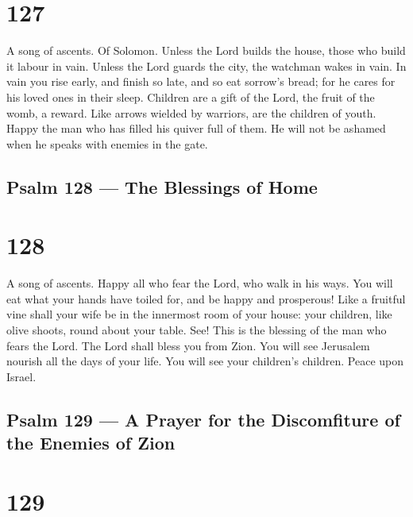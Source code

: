 \hypertarget{section-126}{%
\section{127}\label{section-126}}

A song of ascents. Of Solomon.  Unless the Lord builds the
house, those who build it labour in vain. Unless the Lord guards the
city, the watchman wakes in vain.  In vain you rise early,
and finish so late, and so eat sorrow's bread; for he cares for his
loved ones in their sleep.  Children are a gift of the Lord,
the fruit of the womb, a reward.  Like arrows wielded by
warriors, are the children of youth.  Happy the man who has
filled his quiver full of them. He will not be ashamed when he speaks
with enemies in the gate.

\hypertarget{psalm-128-the-blessings-of-home}{%
\subsection{Psalm 128 --- The Blessings of
Home}\label{psalm-128-the-blessings-of-home}}

\hypertarget{section-127}{%
\section{128}\label{section-127}}

A song of ascents.  Happy all who fear the Lord, who walk in
his ways.  You will eat what your hands have toiled for, and
be happy and prosperous!  Like a fruitful vine shall your
wife be in the innermost room of your house: your children, like olive
shoots, round about your table.  See! This is the blessing
of the man who fears the Lord.  The Lord shall bless you
from Zion. You will see Jerusalem nourish all the days of your life.
 You will see your children's children. Peace upon Israel.

\hypertarget{psalm-129-a-prayer-for-the-discomfiture-of-the-enemies-of-zion}{%
\subsection{Psalm 129 --- A Prayer for the Discomfiture of the Enemies
of
Zion}\label{psalm-129-a-prayer-for-the-discomfiture-of-the-enemies-of-zion}}

\hypertarget{section-128}{%
\section{129}\label{section-128}}

